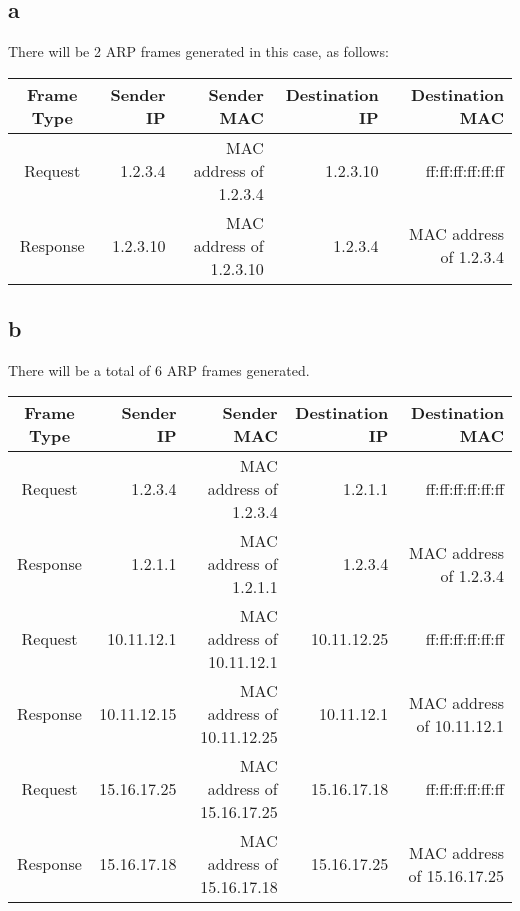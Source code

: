 \documentclass[10pt,a4paper]{article}
\begin{document}
\section{}

\subsection{a}

There will be 2 ARP frames generated in this case, as follows:

\begin{tabular}{| c | r | r | r | r |}
    \hline
    \textbf{Frame Type} & \textbf{Sender IP} & \textbf{Sender MAC} & \textbf{Destination IP} & \textbf{Destination MAC} \\ \hline
    Request & 1.2.3.4 & MAC address of 1.2.3.4 & 1.2.3.10 & ff:ff:ff:ff:ff:ff \\ \hline
    Response & 1.2.3.10 & MAC address of 1.2.3.10 & 1.2.3.4 & MAC address of 1.2.3.4 \\ \hline
\end{tabular}

\subsection{b}

There will be a total of 6 ARP frames generated.

\begin{tabular}{| c | r | r | r | r |}
    \hline
    \textbf{Frame Type} & \textbf{Sender IP} & \textbf{Sender MAC} & \textbf{Destination IP} & \textbf{Destination MAC} \\ \hline
    Request & 1.2.3.4 & MAC address of 1.2.3.4 & 1.2.1.1 & ff:ff:ff:ff:ff:ff \\ \hline
    Response & 1.2.1.1 & MAC address of 1.2.1.1 & 1.2.3.4 & MAC address of 1.2.3.4 \\ \hline
    Request & 10.11.12.1 & MAC address of 10.11.12.1 & 10.11.12.25 & ff:ff:ff:ff:ff:ff \\ \hline
    Response & 10.11.12.15 & MAC address of 10.11.12.25 & 10.11.12.1 & MAC address of 10.11.12.1 \\ \hline
    Request & 15.16.17.25 & MAC address of 15.16.17.25 & 15.16.17.18 & ff:ff:ff:ff:ff:ff \\ \hline
    Response & 15.16.17.18 & MAC address of 15.16.17.18 & 15.16.17.25 & MAC address of 15.16.17.25 \\ \hline 
\end{tabular}
\end{document}

